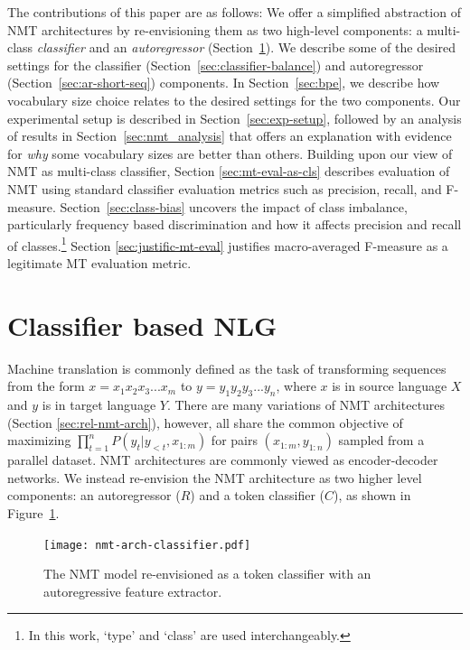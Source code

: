 The contributions of this paper are as follows:
We offer a simplified abstraction of NMT architectures by re-envisioning them as two high-level components: a multi-class \textit{classifier} and an \textit{autoregressor} (Section~\ref{sec:classifier-nlg}).
We describe some of the desired settings for the classifier (Section~\ref{sec:classifier-balance}) and autoregressor (Section~\ref{sec:ar-short-seq}) components.
In Section~\ref{sec:bpe}, we describe how vocabulary size choice relates to the desired settings for the two components.
Our experimental setup is described in Section~\ref{sec:exp-setup}, followed by an analysis of results in Section~\ref{sec:nmt_analysis} that offers an explanation with evidence for \textit{why} some vocabulary sizes are better than others.
Building upon our view of NMT as multi-class classifier, Section \ref{sec:mt-eval-as-cls} describes evaluation of NMT using standard classifier evaluation metrics such as precision, recall, and F-measure.
Section~\ref{sec:class-bias} uncovers the impact of class imbalance, particularly frequency based discrimination and how it affects precision and recall of classes.\footnote{In this work, `type' and `class' are used interchangeably.}
Section \ref{sec:justific-mt-eval} justifies macro-averaged F-measure as a legitimate MT evaluation metric.

\section{Classifier based NLG}
\label{sec:classifier-nlg}

Machine translation is commonly defined as the task of transforming sequences from the form $x = x_1 x_2 x_3 ... x_m$ to $y = y_1 y_2 y_3 ... y_n$, where $x$ is in source language $X$ and $y$ is in target language $Y$.
There are many variations of NMT architectures (Section \ref{sec:rel-nmt-arch}), however, all share the common objective of maximizing ${ \prod_{t=1}^{n} P(y_t | y_{<t}, x_{1:m})}$ for pairs $(x_{1:m}, y_{1:n})$ sampled from a parallel dataset.
NMT architectures are commonly viewed as encoder-decoder networks.
We instead re-envision the NMT architecture as two higher level components: an autoregressor ($R$) and a token classifier ($C$), as shown in Figure~\ref{fig:nmt-architecture}.
\begin{figure}[ht]
    \centering
    \texttt{[image: nmt-arch-classifier.pdf]}
    \caption{The NMT model re-envisioned as a token classifier with an autoregressive feature extractor.}
    \label{fig:nmt-architecture}
\end{figure}

